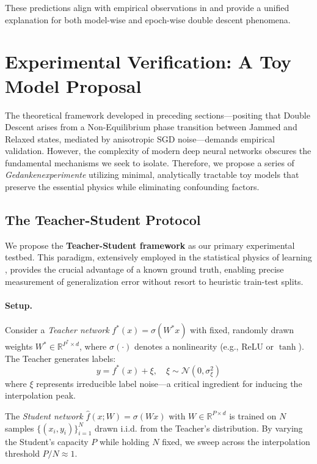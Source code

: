 \documentclass[
  journal=largetwo,
  year=2025,
  volume=37,
]{cup-journal}
\begin{document}
These predictions align with empirical observations in \cite{nakkiran_deep_2019} and provide a unified explanation for both model-wise and epoch-wise double descent phenomena.

\section{Experimental Verification: A Toy Model Proposal}

The theoretical framework developed in preceding sections---positing that Double Descent arises from a Non-Equilibrium phase transition between Jammed and Relaxed states, mediated by anisotropic SGD noise---demands empirical validation. However, the complexity of modern deep neural networks obscures the fundamental mechanisms we seek to isolate. Therefore, we propose a series of \textit{Gedankenexperimente} utilizing minimal, analytically tractable toy models that preserve the essential physics while eliminating confounding factors.

\subsection{The Teacher-Student Protocol}

We propose the \textbf{Teacher-Student framework} as our primary experimental testbed. This paradigm, extensively employed in the statistical physics of learning \cite{engel2001statistical,advani2013statistical}, provides the crucial advantage of a known ground truth, enabling precise measurement of generalization error without resort to heuristic train-test splits.

\paragraph{Setup.} Consider a \textit{Teacher network} $f^*(x) = \sigma(W^* x)$ with fixed, randomly drawn weights $W^* \in \mathbb{R}^{P^* \times d}$, where $\sigma(\cdot)$ denotes a nonlinearity (e.g., ReLU or $\tanh$). The Teacher generates labels:
\begin{equation}
    y = f^*(x) + \xi, \quad \xi \sim \mathcal{N}(0, \sigma_\xi^2)
\end{equation}
where $\xi$ represents irreducible label noise---a critical ingredient for inducing the interpolation peak.

The \textit{Student network} $\hat{f}(x; W) = \sigma(W x)$ with $W \in \mathbb{R}^{P \times d}$ is trained on $N$ samples $\{(x_i, y_i)\}_{i=1}^N$ drawn i.i.d. from the Teacher's distribution. By varying the Student's capacity $P$ while holding $N$ fixed, we sweep across the interpolation threshold $P/N \approx 1$.
\end{document}
